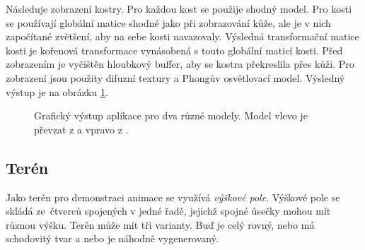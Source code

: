 Následuje zobrazení kostry. Pro každou kost se použije shodný model. Pro kosti se používají globální matice shodné jako při zobrazování kůže, ale je v nich započítané zvětšení, aby na sebe kosti navazovaly.  Výsledná transformační matice kosti je kořenová transformace vynásobená s touto globální maticí kosti. Před zobrazením je vyčištěn hloubkový buffer, aby se kostra překreslila přes kůži. Pro zobrazení jsou použity difuzní textury a Phongův osvětlovací model. Výsledný výstup je na obrázku \ref{graphical_output}.

\begin{figure}[h]
\begin{center}
\qquad
{}
\caption{Grafický výstup aplikace pro dva různé modely. Model vlevo je převzat z \cite{male_mesh} a vpravo z \cite{venom}.} \label{graphical_output}
\end{center}
\end{figure}

\subsection{Terén}
Jako terén pro demonstraci animace se využívá \textit{výškové pole}. Výškové pole se skládá ze~čtverců spojených v jedné řadě, jejichž spojné úsečky mohou mít různou výšku. Terén může mít tři varianty. Buď je celý rovný, nebo má schodovitý tvar a nebo je náhodně vygenerovaný. 

